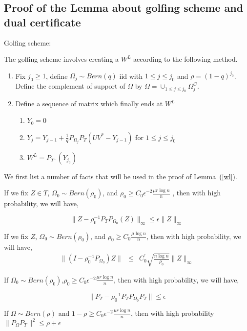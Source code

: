 \newpage
\subsection{Proof of the Lemma about golfing scheme and dual certificate }
Golfing scheme:

The golfing scheme involves creating a $W^{L}$ according to the following method.
\begin{enumerate}
\item Fix $j_{0}\ge1$, define $\Omega_{j}\sim Bern(q)$ iid with $1\le j\le j_{0}$ and $\rho=(1-q)^{j_{0}}$. Define the complement of support of $\Omega$ by $\Omega=\cup_{1\le j\le j_{0}}\Omega_{j}^{C}$.
\item Define a sequence of matrix which finally ends at $W^{L}$
\begin{enumerate}
\item $Y_{0}=0$
\item $Y_{j}=Y_{j-1}+\frac{1}{q}P_{\Omega_{j}}P_{T}(UV^{*}-Y_{j-1})$ for $1\le j\le j_{0}$
\item $W^{L}=P_{\ensuremath{T^{\bot}}}(Y_{j_{0}})$
\end{enumerate}
\end{enumerate}

We first list a number of facts that will be used in the proof of Lemma~(\ref{wl}).\\

\begin{fact}
\label{fact2}
If we fix $Z\in T$, $\Omega_{0}\sim Bern(\rho_{0})$, and $\rho_{0}\ge C_{0}\epsilon^{-2}\frac{\mu r\log n}{n}$ , then with high probability, we will have,

\label{fact5}
\[
\|Z-\rho_{0}^{-1}P_{T}P_{\Omega_{0}}(Z)\|_{\infty}\le\epsilon\|Z\|_{\infty}
\]

\begin{fact}
\label{fact3}
If we fix $Z$, $\Omega_{0}\sim Bern(\rho_{0})$, and $\rho_{0}\ge C_{0}\frac{\mu\log n}{n}$, then with high probability,
we will have,
\begin{eqnarray*}
\|(I-\rho_{0}^{-1}P_{\Omega_{0}})Z\| & \le & C_{0}^{'}\sqrt{\frac{n\log n}{\rho_{0}}}\|Z\|_{\infty}
\end{eqnarray*}

\begin{fact}
\label{fact4}
If $\Omega_{0}\sim Bern(\rho_{0})$,$\rho_{0}\ge C_{0}\epsilon^{-2}\frac{\mu r\log n}{n}$, then with high probability, we will have,

\[
\|P_{T}-\rho_{0}^{-1}P_{T}P_{\Omega_{0}}P_{T}\|\le\epsilon
\]

\begin{fact}
If $\Omega \sim Bern(\rho)$ and $1-\rho\ge C_{0}\epsilon^{-2}\frac{\mu r\log n}{n}$, then with high probability $\|P_{\Omega}P_{T}\|^{2}\le\rho+\epsilon$
\end{fact}
\end{fact}
\end{fact}
\end{fact}


